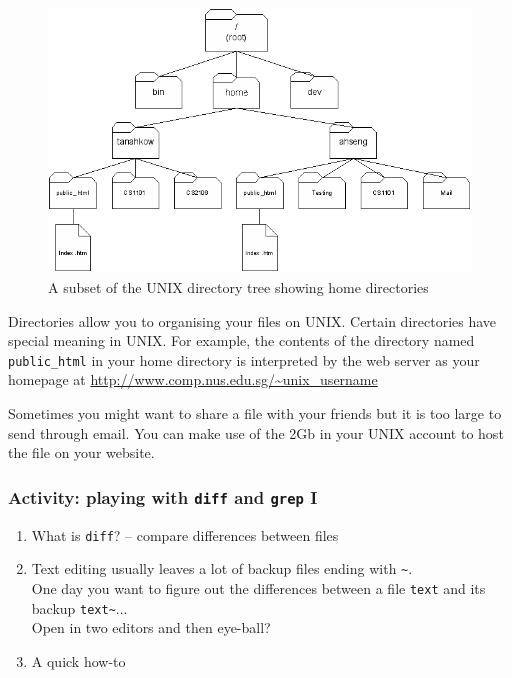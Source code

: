 \begin{frame}
\begin{figure}
\begin{center}
\includegraphics[scale=0.4]{file_home}
\end{center}
\caption{A subset of the UNIX directory tree showing home directories}
\label{fig:dir}
\end{figure}
\end{frame}

Directories allow you to organising your files on UNIX.  Certain directories
have special meaning in UNIX. For example, the contents of the directory named
\texttt{public\_html} in your home directory is interpreted by the web server as
your homepage at \url{http://www.comp.nus.edu.sg/~unix_username}

Sometimes you might want to share a file with your friends but it is too large
to send through email. You can make use of the 2Gb in your UNIX account to host
the file on your website. 


\begin{frame}
\frametitle{Activity: playing with \texttt{diff} and \texttt{grep} I}
\begin{enumerate}
\item What is \texttt{diff}? -- compare differences between files
\item Text editing usually leaves a lot of backup files ending with \texttt{\~}.\\  
One day you want to figure out the differences between a file \texttt{text} and its backup \texttt{text\~}...\\  
Open in two editors and then eye-ball?
\item A quick how-to
\end{enumerate}
\end{frame}



